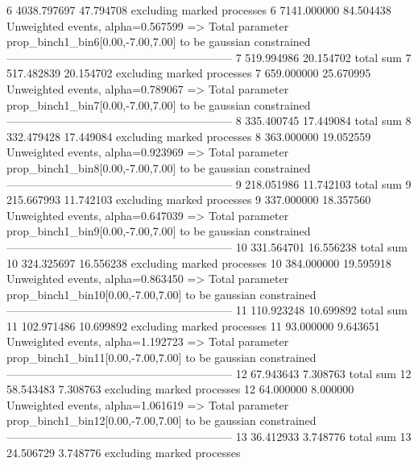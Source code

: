 6          4038.797697     47.794708       excluding marked processes    
6          7141.000000     84.504438       Unweighted events, alpha=0.567599
  => Total parameter prop_binch1_bin6[0.00,-7.00,7.00] to be gaussian constrained
------------------------------------------------------------
7          519.994986      20.154702       total sum                     
7          517.482839      20.154702       excluding marked processes    
7          659.000000      25.670995       Unweighted events, alpha=0.789067
  => Total parameter prop_binch1_bin7[0.00,-7.00,7.00] to be gaussian constrained
------------------------------------------------------------
8          335.400745      17.449084       total sum                     
8          332.479428      17.449084       excluding marked processes    
8          363.000000      19.052559       Unweighted events, alpha=0.923969
  => Total parameter prop_binch1_bin8[0.00,-7.00,7.00] to be gaussian constrained
------------------------------------------------------------
9          218.051986      11.742103       total sum                     
9          215.667993      11.742103       excluding marked processes    
9          337.000000      18.357560       Unweighted events, alpha=0.647039
  => Total parameter prop_binch1_bin9[0.00,-7.00,7.00] to be gaussian constrained
------------------------------------------------------------
10         331.564701      16.556238       total sum                     
10         324.325697      16.556238       excluding marked processes    
10         384.000000      19.595918       Unweighted events, alpha=0.863450
  => Total parameter prop_binch1_bin10[0.00,-7.00,7.00] to be gaussian constrained
------------------------------------------------------------
11         110.923248      10.699892       total sum                     
11         102.971486      10.699892       excluding marked processes    
11         93.000000       9.643651        Unweighted events, alpha=1.192723
  => Total parameter prop_binch1_bin11[0.00,-7.00,7.00] to be gaussian constrained
------------------------------------------------------------
12         67.943643       7.308763        total sum                     
12         58.543483       7.308763        excluding marked processes    
12         64.000000       8.000000        Unweighted events, alpha=1.061619
  => Total parameter prop_binch1_bin12[0.00,-7.00,7.00] to be gaussian constrained
------------------------------------------------------------
13         36.412933       3.748776        total sum                     
13         24.506729       3.748776        excluding marked processes    
